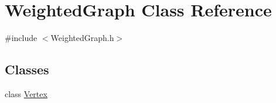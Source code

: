 \hypertarget{class_weighted_graph}{\section{\-Weighted\-Graph \-Class \-Reference}
\label{class_weighted_graph}
}


{\ttfamily \#include $<$\-Weighted\-Graph.\-h$>$}

\subsection*{\-Classes}
\begin{DoxyCompactItemize}
\item 
class \hyperlink{class_weighted_graph_1_1_vertex}{\-Vertex}
\end{DoxyCompactItemize}
